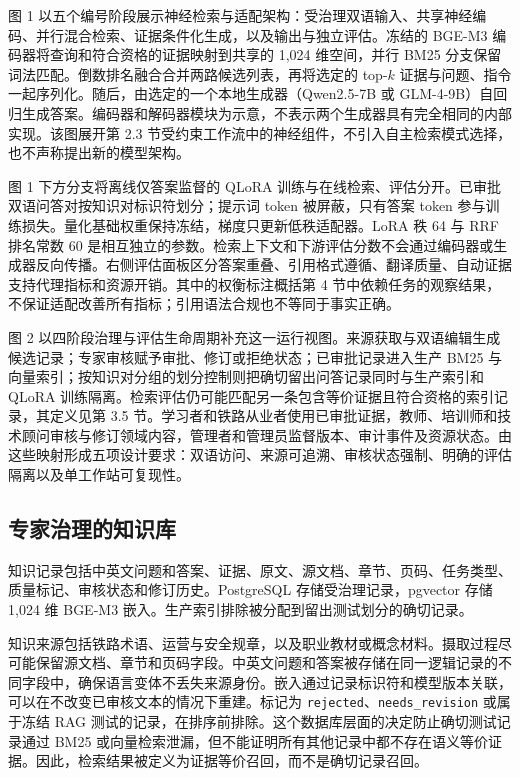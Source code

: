 图 1 以五个编号阶段展示神经检索与适配架构：受治理双语输入、共享神经编码、并行混合检索、证据条件化生成，以及输出与独立评估。冻结的 BGE-M3 编码器将查询和符合资格的证据映射到共享的 1,024 维空间，并行 BM25 分支保留词法匹配。倒数排名融合合并两路候选列表，再将选定的 top-$k$ 证据与问题、指令一起序列化。随后，由选定的一个本地生成器（Qwen2.5-7B 或 GLM-4-9B）自回归生成答案。编码器和解码器模块为示意，不表示两个生成器具有完全相同的内部实现。该图展开第 2.3 节受约束工作流中的神经组件，不引入自主检索模式选择，也不声称提出新的模型架构。

图 1 下方分支将离线仅答案监督的 QLoRA 训练与在线检索、评估分开。已审批双语问答对按知识对标识符划分；提示词 token 被屏蔽，只有答案 token 参与训练损失。量化基础权重保持冻结，梯度只更新低秩适配器。LoRA 秩 64 与 RRF 排名常数 60 是相互独立的参数。检索上下文和下游评估分数不会通过编码器或生成器反向传播。右侧评估面板区分答案重叠、引用格式遵循、翻译质量、自动证据支持代理指标和资源开销。其中的权衡标注概括第 4 节中依赖任务的观察结果，不保证适配改善所有指标；引用语法合规也不等同于事实正确。

图 2 以四阶段治理与评估生命周期补充这一运行视图。来源获取与双语编辑生成候选记录；专家审核赋予审批、修订或拒绝状态；已审批记录进入生产 BM25 与向量索引；按知识对分组的划分控制则把确切留出问答记录同时与生产索引和 QLoRA 训练隔离。检索评估仍可能匹配另一条包含等价证据且符合资格的索引记录，其定义见第 3.5 节。学习者和铁路从业者使用已审批证据，教师、培训师和技术顾问审核与修订领域内容，管理者和管理员监督版本、审计事件及资源状态。由这些映射形成五项设计要求：双语访问、来源可追溯、审核状态强制、明确的评估隔离以及单工作站可复现性。


\subsection{专家治理的知识库}

知识记录包括中英文问题和答案、证据、原文、源文档、章节、页码、任务类型、质量标记、审核状态和修订历史。PostgreSQL 存储受治理记录，pgvector 存储 1,024 维 BGE-M3 嵌入。生产索引排除被分配到留出测试划分的确切记录。

知识来源包括铁路术语、运营与安全规章，以及职业教材或概念材料。摄取过程尽可能保留源文档、章节和页码字段。中英文问题和答案被存储在同一逻辑记录的不同字段中，确保语言变体不丢失来源身份。嵌入通过记录标识符和模型版本关联，可以在不改变已审核文本的情况下重建。标记为 \texttt{rejected}、\texttt{needs\_revision} 或属于冻结 RAG 测试的记录，在排序前排除。这个数据库层面的决定防止确切测试记录通过 BM25 或向量检索泄漏，但不能证明所有其他记录中都不存在语义等价证据。因此，检索结果被定义为证据等价召回，而不是确切记录召回。

